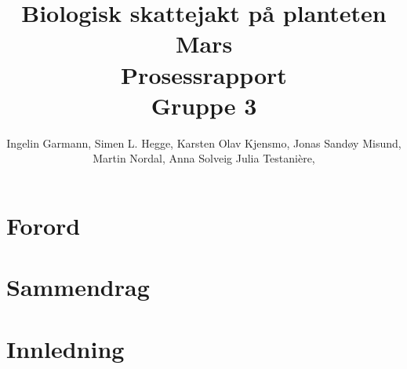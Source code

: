 \documentclass[DIV=calc, paper=a4, fontsize=12pt]{scrartcl}	 %
\title{Biologisk skattejakt på planteten Mars \\ Prosessrapport \\ Gruppe 3} %
\author{Ingelin Garmann, Simen L. Hegge, Karsten Olav Kjensmo, Jonas Sandøy Misund, Martin Nordal, Anna Solveig Julia Testani\`{e}re, } %
\date{} %
\newcommand{\initial}[1]{ %
\lettrine[lines=2,lhang=0.3,nindent=0em]{
\color{DarkBlue}
{\textsf{#1}}}{}}
\begin{document}
\maketitle %

\thispagestyle{fancy} %




\section*{Forord}

\begin{multicols}{2}


\end{multicols}


\section*{Sammendrag}

\begin{multicols}{2}

\end{multicols}


\pagebreak
\renewcommand{\contentsname}%
	{Innhold}

\tableofcontents


\pagebreak
\section{Innledning}


\end{document}
